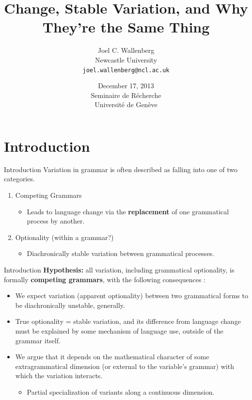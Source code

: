 \documentclass[hyperref={pdfpagelabels=false}]{beamer}
\title{Change, Stable Variation, and Why They're the Same Thing}
\author{Joel C. Wallenberg\\Newcastle University\\\texttt{joel.wallenberg@ncl.ac.uk}}
\institute{}
\date[]{December 17, 2013 \\ Seminaire de Récherche \\Université de Genève}
\begin{document}
\begin{frame}[plain]
\titlepage
\end{frame}


\section{Introduction}
\begin{frame}{Introduction}
	Variation in grammar is often described as falling into one of two categories.
	
	\begin{enumerate}
		\item Competing Grammars
		\begin{itemize}
			\item Leads to language change via the \textbf{replacement} of one grammatical process by another.
		\end{itemize}
		\item Optionality (within a grammar?)
		\begin{itemize}
			\item Diachronically stable variation between grammatical processes.
		\end{itemize}
	\end{enumerate}
	
\end{frame}

\begin{frame}{Introduction}
	\textbf{Hypothesis:} all variation, including grammatical optionality, is formally \textbf{competing grammars}, with the following consequences \citep{fruehwaldwallenberg2013}:
	\begin{itemize}
		\item We expect variation (apparent optionality) between two grammatical forms to be diachronically unstable, generally.
		\item True optionality = stable variation, and its difference from language change must be explained by some mechanism of language use, outside of the grammar itself. 
		\item We argue that it depends on the mathematical character of some extragrammatical dimension (or external to the variable's grammar) with which the variation interacts.
			\begin{itemize} \item Partial specialization of variants along a continuous dimension. \end{itemize}
	\end{itemize}

\end{frame}
\end{document}
